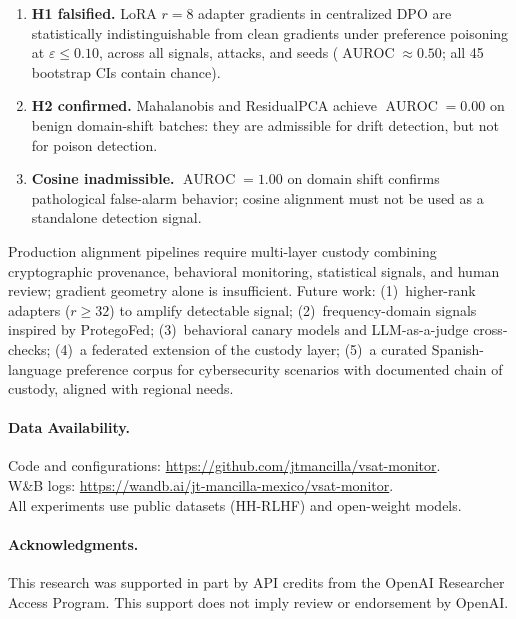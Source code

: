 \documentclass[runningheads]{llncs}
\DeclareMathOperator{\AUROC}{AUROC}
\begin{document}
\begin{enumerate}[leftmargin=*,noitemsep]
  \item \textbf{H1 falsified.} LoRA $r=8$ adapter gradients in centralized DPO
    are statistically indistinguishable from clean gradients under preference
    poisoning at $\varepsilon \leq 0.10$, across all signals, attacks, and
    seeds ($\AUROC \approx 0.50$; all 45 bootstrap CIs contain chance).
  \item \textbf{H2 confirmed.} Mahalanobis and ResidualPCA achieve $\AUROC =
    0.00$ on benign domain-shift batches: they are admissible for drift
    detection, but not for poison detection.
  \item \textbf{Cosine inadmissible.} $\AUROC = 1.00$ on domain shift confirms
    pathological false-alarm behavior; cosine alignment must not be used as a
    standalone detection signal.
\end{enumerate}

Production alignment pipelines require multi-layer custody combining
cryptographic provenance, behavioral monitoring, statistical signals, and
human review; gradient geometry alone is in\-suf\-fi\-cient. Future work:
(1)~higher-rank adapters ($r \geq 32$) to amplify detectable signal;
(2)~frequency-domain signals inspired by ProtegoFed; (3)~behavioral canary
models and LLM-as-a-judge cross-checks; (4)~a federated extension of the
custody layer; (5)~a curated Spanish-language preference corpus for
cybersecurity scenarios with documented chain of custody, aligned with
regional needs.

\paragraph{Data Availability.}
Code and configurations: \url{https://github.com/jtmancilla/vsat-monitor}.\\
W\&B logs: \url{https://wandb.ai/jt-mancilla-mexico/vsat-monitor}.\\
All experiments use public datasets (HH-RLHF) and open-weight models.

\paragraph{Acknowledgments.}
This research was supported in part by API credits from the OpenAI Researcher
Access Program. This support does not imply review or endorsement by OpenAI.

\appendix
\end{document}
